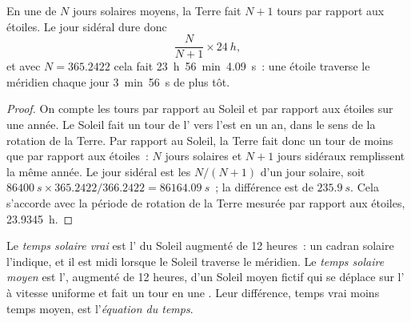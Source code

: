 \begin{proposition}\label{prop:b1:spherical-astronomy:sidereal-day}
En une  de $N$ jours solaires moyens, la Terre fait $N + 1$ tours
par rapport aux étoiles. Le jour sidéral dure donc
\[
  \frac{N}{N + 1}\times\qty{24}{h},
\]
et avec $N = 365.2422$ cela fait \qty{23}{h}~\qty{56}{min}~\qty{4.09}{s}~: une
étoile traverse le méridien chaque jour \qty{3}{min}~\qty{56}{s} de  plus tôt.
\end{proposition}

\begin{proof}
On compte les tours par rapport au Soleil et par rapport aux étoiles sur une
année. Le Soleil fait un tour de l' vers l'est en un an, dans le
sens de la rotation de la Terre. Par rapport au Soleil, la Terre fait donc un
tour de moins que par rapport aux étoiles~: $N$ jours solaires et $N + 1$ jours
sidéraux remplissent la même année. Le jour sidéral est les $N/(N+1)$ d'un
jour solaire, soit
$\qty{86400}{s}\times 365.2422/366.2422 = \qty{86164.09}{s}$~; la différence
est de $\qty{235.9}{s}$. Cela s'accorde avec la période de rotation de la
Terre mesurée par rapport aux étoiles, \qty{23.9345}{h}.
\end{proof}

\begin{definition}\label{def:b1:spherical-astronomy:solar-time}
Le \emph{temps solaire vrai} est l' du
Soleil augmenté de 12 heures~: un cadran solaire l'indique, et il est midi
lorsque le Soleil traverse le méridien. Le \emph{temps solaire
moyen} est l', augmenté de 12 heures,
d'un Soleil moyen fictif qui se déplace sur l' à vitesse
uniforme et fait un tour en une . Leur différence, temps vrai
moins temps moyen, est l'\emph{équation du temps}.
\end{definition}

